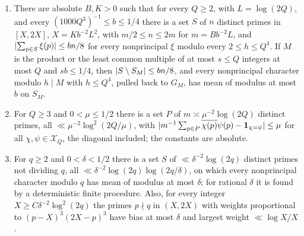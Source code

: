 \begin{lemma}\label{dir:lem:codesample}
\begin{enumerate}[label=\textup{(\alph*)}]
\item There are absolute $B,K>0$ such that for every $Q\ge2$, with $L=\log(2Q)$, and every
$(1000Q^3)^{-1}\le b\le1/4$ there is a set $S$ of $n$ distinct primes in $[X,2X]$, $X=Kb^{-2}L^2$, with
$m/2\le n\le2m$ for $m=Bb^{-2}L$, and $\lvert\sum_{p\in S}\xi(p)\rvert\le bn/8$ for every nonprincipal $\xi$
modulo every $2\le h\le Q^4$. If $M$ is the product or the least common multiple of at most $s\le Q$
integers at most $Q$ and $sb\le1/4$, then $\lvert S\setminus S_M\rvert\le bn/8$, and every nonprincipal character
modulo $h\mid M$ with $h\le Q^4$, pulled back to $G_M$, has mean of modulus at most $b$ on $S_M$.
\item For $Q\ge3$ and $0<\mu\le1/2$ there is a set $P$ of $m\asymp\mu^{-2}\log(2Q)$ distinct primes, all
$\ll\mu^{-2}\log^2(2Q/\mu)$, with
$\lvert m^{-1}\sum_{p\in P}\overline{\chi(p)}\psi(p)-\mathbf 1_{\chi=\psi}\rvert\le\mu$ for all $\chi,\psi\in\mathcal X_Q$,
the diagonal included; the constants are absolute.
\item For $q\ge2$ and $0<\delta<1/2$ there is a set $S$ of $\ll\delta^{-2}\log(2q)$ distinct primes not dividing
$q$, all $\ll\delta^{-2}\log(2q)\log(2q/\delta)$, on which every nonprincipal character modulo $q$ has mean
of modulus at most $\delta$; for rational $\delta$ it is found by a deterministic finite procedure. Also, for
every integer $X\ge C\delta^{-2}\log^2(2q)$ the primes $p\nmid q$ in $(X,2X)$ with weights proportional to
$(p-X)^3(2X-p)^3$ have bias at most $\delta$ and largest weight $\ll\log X/X$.
\end{enumerate}
\end{lemma}

